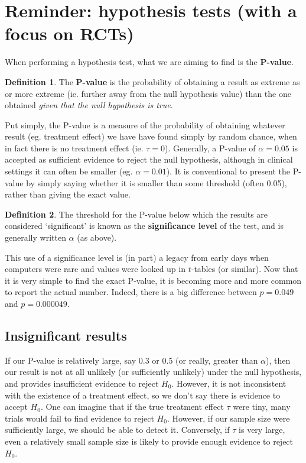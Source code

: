 \documentclass[
  openany]{book}
\theoremstyle{definition}
\newtheorem{definition}{Definition}[chapter]
\theoremstyle{definition}
\theoremstyle{definition}
\theoremstyle{definition}
\theoremstyle{remark}
\begin{document}
\section{Reminder: hypothesis tests (with a focus on RCTs)}\label{reminder-hypothesis-tests-with-a-focus-on-rcts}

When performing a hypothesis test, what we are aiming to find is the \textbf{P-value}.

\begin{definition}
The \textbf{P-value} is the probability of obtaining a result as extreme as or more extreme (ie. further away from the null hypothesis value) than the one obtained \emph{given that the null hypothesis is true}.
\end{definition}

Put simply, the P-value is a measure of the probability of obtaining whatever result (eg. treatment effect) we have have found simply by random chance, when in fact there is no treatment effect (ie. \(\tau=0\)). Generally, a P-value of \(\alpha = 0.05\) is accepted as sufficient evidence to reject the null hypothesis, although in clinical settings it can often be smaller (eg. \(\alpha = 0.01\)). It is conventional to present the P-value by simply saying whether it is smaller than some threshold (often 0.05), rather than giving the exact value.

\begin{definition}
The threshold for the P-value below which the results are considered `significant' is known as the \textbf{significance level} of the test, and is generally written \(\alpha\) (as above).
\end{definition}

This use of a significance level is (in part) a legacy from early days when computers were rare and values were looked up in \(t\)-tables (or similar). Now that it is very simple to find the exact P-value, it is becoming more and more common to report the actual number. Indeed, there is a big difference between \(p=0.049\) and \(p=0.000049\).

\subsection{Insignificant results}\label{insignificant-results}

If our P-value is relatively large, say 0.3 or 0.5 (or really, greater than \(\alpha\)), then our result is not at all unlikely (or sufficiently unlikely) under the null hypothesis, and provides insufficient evidence to reject \(H_0.\) However, it is not inconsistent with the existence of a treatment effect, so we don't say there is evidence to accept \(H_0\). One can imagine that if the true treatment effect \(\tau\) were tiny, many trials would fail to find evidence to reject \(H_0\). However, if our sample size were sufficiently large, we should be able to detect it. Conversely, if \(\tau\) is very large, even a relatively small sample size is likely to provide enough evidence to reject \(H_0\).
\end{document}
